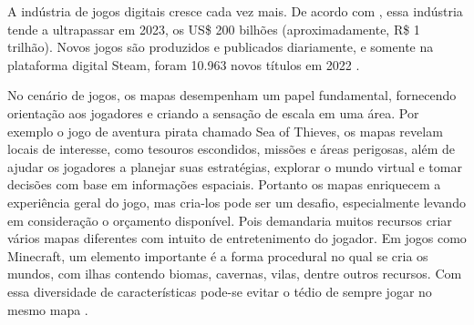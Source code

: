 A indústria de jogos digitais cresce cada vez mais. De acordo com \space{}, essa indústria tende a ultrapassar em 2023, os US\$ 200 bilhões (aproximadamente, R\$ 1 trilhão). Novos jogos são produzidos e publicados diariamente, e somente na plataforma digital Steam, foram 10.963 novos títulos em 2022\space
\cite{numero_de_jogos_publicados_na_steam}.

No cenário de jogos, os mapas desempenham um papel fundamental, fornecendo orientação aos jogadores e criando a sensação de escala em uma área. Por exemplo o jogo de aventura pirata chamado Sea of Thieves, os mapas revelam locais de interesse, como tesouros escondidos, missões e áreas perigosas, além de ajudar os jogadores a planejar suas estratégias, explorar o mundo virtual e tomar decisões com base em informações espaciais. Portanto os mapas enriquecem a experiência geral do jogo, mas cria-los pode ser um desafio, especialmente levando em consideração o orçamento disponível. Pois demandaria muitos recursos criar vários mapas diferentes com intuito de entretenimento do jogador. Em jogos como Minecraft, um elemento importante é a forma procedural no qual se cria os mundos, com ilhas contendo biomas, cavernas, vilas, dentre outros recursos. Com essa diversidade de características pode-se evitar o tédio de sempre jogar no mesmo mapa \cite{video-game-maps, lecafedugeek}.



